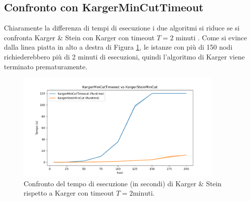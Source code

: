 \subsection{Confronto con KargerMinCutTimeout}

\noindent Chiaramente la differenza di tempi di esecuzione i due algoritmi si riduce se si confronta Karger \& Stein con Karger con timeout $T = 2$ minuti . Come si evince dalla linea piatta in alto a destra di Figura \ref{fig:karger-timeout-vs-karger-stein}, le istanze con più di 150 nodi richiederebbero più di 2 minuti di esecuzioni, quindi l'algoritmo di Karger viene terminato prematuramente.

\begin{figure}[H]
    \centering

    \includegraphics[width=0.9\textwidth]{./images/karger_timeout_vs_karger_stein.png}

    \caption{Confronto del tempo di esecuzione (in secondi) di Karger \& Stein rispetto a Karger con timeout $T = 2 \text{minuti}$.}
    \label{fig:karger-timeout-vs-karger-stein}
\end{figure}

